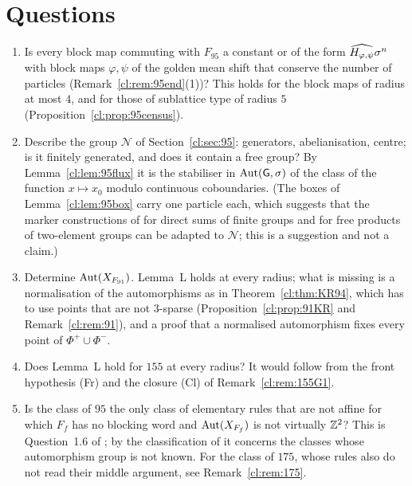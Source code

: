 \section{Questions}\label{sec:questions}

\begin{enumerate}
\item Is every block map commuting with $F_{95}$ a constant or of the form $\widehat{H_{\varphi,\psi}}\sigma^n$ with block maps $\varphi,\psi$ of the golden mean shift that conserve the number of particles (Remark~\ref{cl:rem:95end}(1))? This holds for the block maps of radius at most $4$, and for those of sublattice type of radius $5$ (Proposition~\ref{cl:prop:95census}).
\item Describe the group $\mathcal N$ of Section~\ref{cl:sec:95}: generators, abelianisation, centre; is it finitely generated, and does it contain a free group? By Lemma~\ref{cl:lem:95flux} it is the stabiliser in $\operatorname{Aut}(\mathsf G,\sigma)$ of the class of the function $x\mapsto x_0$ modulo continuous coboundaries. (The boxes of Lemma~\ref{cl:lem:95box} carry one particle each, which suggests that the marker constructions of \cite[Theorems~2.3 and~2.4]{BLR1988} for direct sums of finite groups and for free products of two-element groups can be adapted to $\mathcal N$; this is a suggestion and not a claim.)
\item Determine $\operatorname{Aut}(X_{F_{91}})$. Lemma~L holds at every radius; what is missing is a normalisation of the automorphisms as in Theorem~\ref{cl:thm:KR94}, which has to use points that are not $3$-sparse (Proposition~\ref{cl:prop:91KR} and Remark~\ref{cl:rem:91}), and a proof that a normalised automorphism fixes every point of $\Phi^+\cup\Phi^-$.
\item Does Lemma~L hold for $155$ at every radius? It would follow from the front hypothesis (Fr) and the closure (Cl) of Remark~\ref{cl:rem:155G1}.
\item Is the class of $95$ the only class of elementary rules that are not affine for which $F_f$ has no blocking word and $\operatorname{Aut}(X_{F_f})$ is not virtually $\mathbb{Z}^2$? This is Question~1.6 of \cite{PaperC}; by the classification of \cite{PaperD} it concerns the classes whose automorphism group is not known. For the class of $175$, whose rules also do not read their middle argument, see Remark~\ref{cl:rem:175}.
\end{enumerate}
